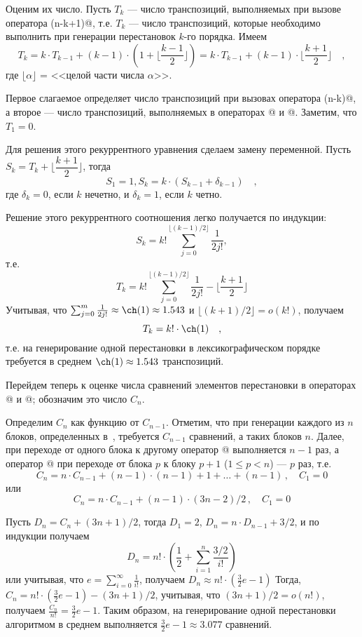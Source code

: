 \documentclass[12pt,a4paper]{article}
\theoremstyle{plain}
\theoremstyle{definition}
\theoremstyle{remark}
\begin{document}
Оценим их число. Пусть $T_k$ --- число транспозиций, выполняемых при вызове оператора \verb@LEC(n-k+1)@, т.е. $T_k$ --- число транспозиций, которые необходимо выполнить при генерации перестановок $k$-го порядка. Имеем \[ T_k =k\cdot T_{k-1}+(k-1)\cdot(1+\lfloor\frac{k-1}{2}\rfloor)= k\cdot T_{k-1}+(k-1)\cdot\lfloor\frac{k+1}{2}\rfloor \quad,\] где $\lfloor\alpha\rfloor$ = <<целой части числа $\alpha$>>.

Первое слагаемое определяет число транспозиций при вызовах оператора \verb@LEC(n-k)@, а второе --- число транспозиций, выполняемых в операторах @ и @. Заметим, что $T_1=0$.

Для решения этого рекуррентного уравнения сделаем замену переменной. Пусть $S_k=T_k+\lfloor\dfrac{k+1}{2}\rfloor$, тогда \[ S_1=1, S_k=k\cdot(S_{k-1}+\delta_{k-1})\quad, \] где $\delta_k=0$, если $k$ нечетно, и $\delta_k=1$, если $k$ четно.

Решение этого рекуррентного соотношения легко получается по индукции: 
\[S_k = k! \sum_{j=0}^{\lfloor (k-1)/2 \rfloor} \frac{1}{2j!}, \] т.е. 
\[T_k = k! \sum_{j=0}^{\lfloor (k-1)/2 \rfloor} \frac{1}{2j!} - \lfloor \frac{k+1}{2} \rfloor \] Учитывая, что $\sum_{j=0}^{m} \frac{1}{2j!} \approx \ch(1) \approx 1.543$ и $\lfloor (k+1)/2 \rfloor = o(k!)$, получаем \[ T_k = k! \cdot \ch(1)\quad, \] т.е. на генерирование одной перестановки в лексикографическом порядке требуется в среднем $\ch(1)\approx 1.543$ транспозиций.

Перейдем теперь к оценке числа сравнений элементов перестановки в операторах @ и @; обозначим это число $C_n$.

Определим $C_n$ как функцию от $C_{n-1}$. Отметим, что при генерации каждого из $n$ блоков, определенных в~, требуется $C_{n-1}$ сравнений, а таких блоков $n$. Далее, при переходе от одного блока к другому оператор @ выполняется $n-1$ раз, а оператор @ при переходе от блока $p$ к блоку $p+1$ ($1\le p<n$) --- $p$ раз, т.е.
\[ C_n = n\cdot C_{n-1} + (n-1)\cdot(n-1)+1+\ldots+(n-1) \,,\quad C_1=0 \]
или 
\[ C_n = n\cdot C_{n-1}+(n-1)\cdot(3n-2)/2 \,,\quad C_1=0 \]

Пусть $D_n=C_n+(3n+1)/2$, тогда $D_1=2$, $D_n=n\cdot D_{n-1}+3/2$, и по индукции получаем 
\[ D_n = n! \cdot (\frac{1}{2} + \sum_{i=1}^{n} \frac{3/2}{i!}) \]
или учитывая, что $e = \sum_{i=0}^{\infty} \frac{1}{i!} $, получаем $D_n \approx n!\cdot(\frac{3}{2}e - 1)$
Тогда, $C_n = n!\cdot (\frac{3}{2}e - 1) - (3n+1)/2$, учитывая, что $(3n+1)/2 = o(n!)$, получаем $\frac{C_n}{n!} = \frac{3}{2}e - 1$. Таким образом, на генерирование одной перестановки алгоритмом \verb@LEX@ в среднем выполняется $\frac{3}{2}e-1 \approx 3.077$ сравнений.
\end{document}
